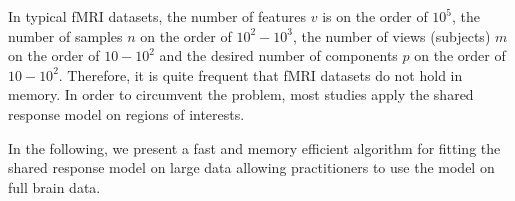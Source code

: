 


In typical fMRI datasets, the number of features $v$ is on the order of $10^5$,
the number of samples $n$ on the order of $10^2-10^3$, the number of views
(subjects) 
$m$ on the order of $10-10^2$ and the desired number of components $p$ on the order
of $10-10^2$.
Therefore, it is quite frequent that fMRI datasets do not hold in memory.
In order to circumvent the problem, most studies apply the shared response model
on regions of interests.

In the following, we present a fast and memory efficient algorithm for
fitting the shared response model on large data allowing practitioners to use
the model on full brain data.


